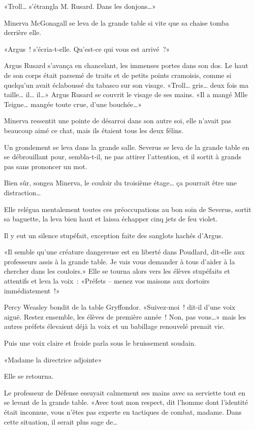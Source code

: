 «Troll… s'étrangla M. Rusard. Dans les donjons…»

Minerva McGonagall se leva de la grande table si vite que sa chaise tomba derrière elle.

«Argus~! s'écria-t-elle. Qu'est-ce qui vous est arrivé~?»

Argus Rusard s'avança en chancelant, les immenses portes dans son dos. Le haut de son corps était parsemé de traits et de petits points cramoisis, comme si quelqu'un avait éclaboussé du tabasco sur son visage. «Troll… gris… deux fois ma taille… il… il…» Argus Rusard se couvrit le visage de ses mains. «Il a mangé Mlle Teigne… mangée toute crue, d'une bouchée…»

Minerva ressentit une pointe de désarroi dans son autre soi, elle n'avait pas beaucoup aimé ce chat, mais ils étaient tous les deux félins.

Un grondement se leva dans la grande salle. Severus se leva de la grande table en se débrouillant pour, sembla-t-il, ne pas attirer l'attention, et il sortit à grands pas sans prononcer un mot.

Bien sûr, songea Minerva, le couloir du troisième étage… ça pourrait être une distraction…

Elle relégua mentalement toutes ces préoccupations au bon soin de Severus, sortit sa baguette, la leva bien haut et laissa échapper cinq jets de feu violet.

Il y eut un silence stupéfait, exception faite des sanglots hachés d'Argus.

«Il semble qu'une créature dangereuse est en liberté dans Poudlard, dit-elle aux professeurs assis à la grande table. Je vais vous demander à tous d'aider à la chercher dans les couloirs.» Elle se tourna alors vers les élèves stupéfaits et attentifs et leva la voix~: «Préfets -- menez vos maisons aux dortoirs immédiatement~!»

Percy Weasley bondit de la table Gryffondor. «Suivez-moi~! dit-il d'une voix aiguë. Restez ensemble, les élèves de première année~! Non, pas vous…» mais les autres préfets élevaient déjà la voix et un babillage renouvelé prenait vie.

Puis une voix claire et froide parla sous le bruissement soudain.

«Madame la directrice adjointe»

Elle se retourna.

Le professeur de Défense essuyait calmement ses mains avec sa serviette tout en se levant de la grande table. «Avec tout mon respect, dit l'homme dont l'identité était inconnue, vous n'êtes pas experte en tactiques de combat, madame. Dans cette situation, il serait plus sage de…

